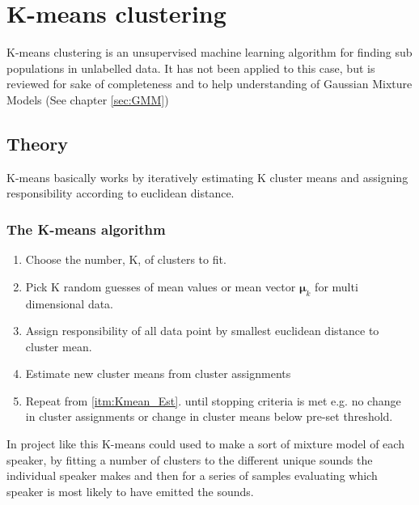 \chapter{K-means clustering}
K-means clustering is an unsupervised machine learning algorithm for finding sub populations in unlabelled data.
It has not been applied to this case, but is reviewed for sake of completeness and to help understanding of Gaussian Mixture Models (See chapter \ref{sec:GMM}) 
\section{Theory} 

K-means basically works by iteratively estimating K cluster means and assigning responsibility according to euclidean distance.

\subsection{The K-means algorithm}
\begin{enumerate}

\item
Choose the number, K, of clusters to fit.

\item
Pick K random guesses of mean values or mean vector $ \bm{\mu}_k $ for multi dimensional data.

\item \label{itm:Kmean_Est}
Assign responsibility of all data point by smallest euclidean distance to cluster mean.

\item \label{itm:Kmean_Max}
Estimate new cluster means from cluster assignments

\item
Repeat from \ref{itm:Kmean_Est}. until stopping criteria is met e.g. no change in cluster assignments or change in cluster means below pre-set threshold. 

\end{enumerate}


In project like this K-means could used to make a sort of mixture model of each speaker, by fitting a number of clusters to the different unique sounds the individual speaker makes and then for a series of samples evaluating which speaker is most likely to have emitted the sounds.
  
